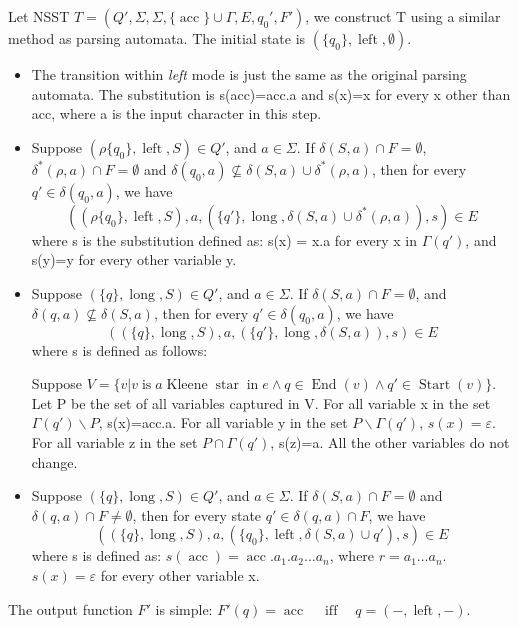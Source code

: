 \documentclass[sigplan,review,anonymous]{acmart}\settopmatter{printfolios=true,printccs=false,printacmref=false}
\newcommand{\tmop}[1]{\ensuremath{\operatorname{#1}}}
\newcommand{\tmtextit}[1]{{\itshape{#1}}}
\begin{document}
Let NSST $T = (Q', \Sigma, \Sigma, \{ \tmop{acc} \} \cup \Gamma, E, q_0',
F')$, we construct T using a similar method as parsing
automata{\cite{chenWhatDecidableString2018}}. The initial state is $(\{ q_0
\}, \tmop{left}, \emptyset)$.
\begin{itemize}
  \item The transition within \tmtextit{left} mode is just the same as the
  original parsing automata. The substitution is s(acc)=acc.a and s(x)=x for
  every x other than acc, where a is the input character in this step.
  
  \item Suppose $(\rho \{ q_0 \}, \tmop{left}, S) \in Q'$, and $a \in \Sigma$.
  If $\delta (S, a) \cap F = \emptyset$, $\delta^{\ast} (\rho, a) \cap F =
  \emptyset$ and $\delta (q_0, a) \nsubseteq \delta (S, a) \cup \delta^{\ast}
  (\rho, a)$, then for every $q' \in \delta (q_0, a)$, we have
  \[ ((\rho \{ q_0 \}, \tmop{left}, S), a, (\{ q' \}, \tmop{long}, \delta (S,
     a) \cup \delta^{\ast} (\rho, a)), s) \in E \]
  where s is the substitution defined as: s(x) = x.a for every x in $\Gamma
  (q')$, and s(y)=y for every other variable y.
  
  \item Suppose $(\{ q \}, \tmop{long}, S) \in Q'$, and $a \in \Sigma$. If
  $\delta (S, a) \cap F = \emptyset$, and \ $\delta (q, a) \nsubseteq \delta
  (S, a)$, then for every $q' \in \delta (q_0, a)$, we have
  \[ ((\{ q \}, \tmop{long}, S), a, (\{ q' \}, \tmop{long}, \delta (S, a)), s)
     \in E \]
  where s is defined as follows:
  
  Suppose $V = \{ v|v \tmop{is} a \tmop{Kleene} \tmop{star} \tmop{in} e \wedge
  q \in \tmop{End} (v) \wedge q' \in \tmop{Start} (v) \}$. Let P be the set of
  all variables captured in V. For all variable x in the set $\Gamma (q')
  \backslash P$, s(x)=acc.a. For all variable y in the set $P\backslash \Gamma
  (q')$, $s (x) = \varepsilon$. For all variable z in the set $P \cap \Gamma
  (q')$, s(z)=a. All the other variables do not change.
  
  \item Suppose $(\{ q \}, \tmop{long}, S) \in Q'$, and $a \in \Sigma$. If
  $\delta (S, a) \cap F = \emptyset$ and $\delta (q, a) \cap F \neq
  \emptyset$, then for every state $q' \in \delta (q, a) \cap F$, we have
  \[ ((\{ q \}, \tmop{long}, S), a, (\{ q_0 \}, \tmop{left}, \delta (S, a)
     \cup q'), s) \in E \]
  where s is defined as: $s (\tmop{acc}) = \tmop{acc} .a_1 .a_2 \ldots a_n$,
  where $r = a_1 \ldots a_n$. $s (x) = \varepsilon$ for every other variable
  x.
\end{itemize}
The output function $F'$ is simple: $F' (q) = \tmop{acc} \quad \tmop{iff}
\quad q = (-, \tmop{left}, -) $.
\end{document}
